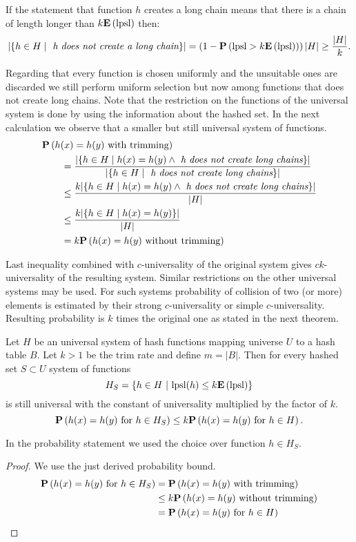 If the statement that function $h$ creates a long chain means that there is a chain of length longer than $k \mathbf{E}\left(\mathrm{lpsl}\right)$ then:
\[
|\lbrace h \in H \mid \textit{ h does not create a long chain} \rbrace| 
	= \left(1 - \mathbf{P}\left(\mathrm{lpsl} > k \mathbf{E}\left(\mathrm{lpsl}\right)\right)\right) |H| 
	\geq \frac{|H|}{k} \text{.}
\]

Regarding that every function is chosen uniformly and the unsuitable ones are discarded we still perform uniform selection but now among functions that does not create long chains. Note that the restriction on the functions of the universal system is done by using the information about the hashed set. In the next calculation we observe that a smaller but still universal system of functions.
\[
\begin{split}
& \mathbf{P}\left(h(x) = h(y) \text{ with trimming}\right) \\
	& \qquad =  \frac{|\{ h \in H \mid h(x) = h(y) \wedge \textit{ h does not create long chains} \}|}{|\lbrace h \in H \mid \textit{ h does not create long chains} \rbrace|} \\
	& \qquad \leq \frac{k |\{ h \in H \mid h(x) = h(y) \wedge \textit{ h does not create long chains} \}|}{|H|} \\ 
	& \qquad \leq \frac{k |\{ h \in H \mid h(x) = h(y) \}|}{|H|} \\
	& \qquad = k \mathbf{P}\left(h(x) = h(y) \text{ without trimming}\right) \\
\end{split}
\]

Last inequality combined with $c$-universality of the original system gives $ck$-universality of the resulting system. Similar restrictions on the other universal systems may be used. For such systems probability of collision of two (or more) elements is estimated by their strong $c$-universality or simple $c$-universality. Resulting probability is $k$ times the original one as stated in the next theorem.

\begin{theorem}
Let $H$ be an universal system of hash functions mapping universe $U$ to a hash table $B$. Let $k > 1$ be the trim rate and define $m = |B|$. Then for every hashed set $S \subset U$ system of functions 
\[
	H_S = \{ h \in H \ | \  \mathrm{lpsl}(h) \leq k \mathbf{E}\left(\mathrm{lpsl}\right) \}
\]
is still universal with the constant of universality multiplied by the factor of $k$.
\[
	\mathbf{P}\left(h(x) = h(y) \text{ for } h \in H_S\right) \leq k \mathbf{P}\left(h(x) = h(y) \text{ for } h \in H\right) \text{.}
\]
\end{theorem}
In the probability statement we used the choice over function $h \in H_S$.
\begin{proof}
We use the just derived probability bound.
\[
\begin{split}
\mathbf{P}\left(h(x) = h(y) \text{ for } h \in H_S\right) 
	& = \mathbf{P}\left(h(x) = h(y) \text{ with trimming}\right) \\
	& \leq k \mathbf{P}\left(h(x) = h(y) \text{ without trimming}\right) \\
	& = \mathbf{P}\left(h(x) = h(y) \text{ for } h \in H\right) \\
\end{split}
\]
\end{proof}

